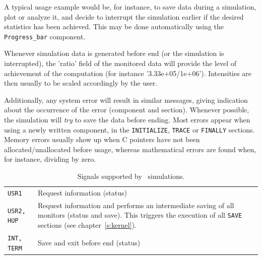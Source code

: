 A typical usage example would be, for instance, to save data during a
simulation, plot or analyze it, and decide to interrupt the simulation earlier
if the desired statistics has been achieved. This may be done automatically
using the \verb+Progress_bar+ component.

Whenever simulation data is generated before end (or the simulation is
interrupted), the 'ratio' field of the monitored data will provide the level of
achievement of the computation (for instance '3.33e+05/1e+06'). Intensities are
then usually to be scaled accordingly by the user.

Additionally, any system error will result in similar messages, giving
indication about the occurrence of the error (component and section). Whenever
possible, the simulation will {\em try} to save the data before ending. Most
errors appear when using a newly written component, in the \texttt{INITIALIZE},
\texttt{TRACE} or \texttt{FINALLY} sections. Memory errors usually show up when
C pointers have not been allocated/unallocated before usage, whereas
mathematical errors are found when, for instance, dividing by zero.

\begin{table}
  \begin{center}
    {\let\my=\\
    \begin{tabular}{|p{}|p{}|}
      \hline
      \texttt{USR1} & Request information (status)  \\
      \texttt{USR2, HUP} & Request information and performs an intermediate
      saving of all monitors (status and save). This triggers the execution of
      all \texttt{SAVE} sections (see chapter~\ref{s:kernel}).  \\
      \texttt{INT, TERM} & Save and exit before end (status)  \\
      \hline
    \end{tabular}
    \caption{Signals supported by \MCS\ simulations.}
    \label{t:signals}
    }
  \end{center}
\end{table}

